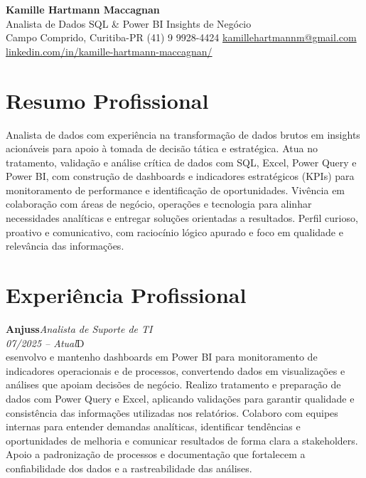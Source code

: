 \documentclass[11pt,a4paper]{article}
\newcommand{\cvrole}[4]{%
  \vspace{4pt}%
  {\bfseries\color{accentcolor}#1}\hfill{\itshape #2}\\[-2pt]%
  {\itshape #3}\hfill #4\\[6pt]%
}
\begin{document}
\begin{center}
  {\fontsize{20}{24}\selectfont\bfseries Kamille Hartmann Maccagnan}\\[8pt]
  {\large Analista de Dados \textbar{} SQL \& Power BI \textbar{} Insights de Negócio}\\[10pt]
  Campo Comprido, Curitiba-PR \enspace\textbullet\enspace (41) 9 9928-4424 \enspace\textbullet\enspace
  \href{mailto:kamillehartmannm@gmail.com}{kamillehartmannm@gmail.com}\\[3pt]
  \href{https://linkedin.com/in/kamille-hartmann-maccagnan/}{linkedin.com/in/kamille-hartmann-maccagnan/}
\end{center}

\vspace{6pt}

\section{Resumo Profissional}

Analista de dados com experiência na transformação de dados brutos em insights acionáveis para apoio à tomada de decisão tática e estratégica. Atua no tratamento, validação e análise crítica de dados com SQL, Excel, Power Query e Power BI, com construção de dashboards e indicadores estratégicos (KPIs) para monitoramento de performance e identificação de oportunidades. Vivência em colaboração com áreas de negócio, operações e tecnologia para alinhar necessidades analíticas e entregar soluções orientadas a resultados. Perfil curioso, proativo e comunicativo, com raciocínio lógico apurado e foco em qualidade e relevância das informações.

\section{Experiência Profissional}

\cvrole{Anjuss}{Analista de Suporte de TI}{07/2025 -- Atual}

Desenvolvo e mantenho dashboards em Power BI para monitoramento de indicadores operacionais e de processos, convertendo dados em visualizações e análises que apoiam decisões de negócio. Realizo tratamento e preparação de dados com Power Query e Excel, aplicando validações para garantir qualidade e consistência das informações utilizadas nos relatórios. Colaboro com equipes internas para entender demandas analíticas, identificar tendências e oportunidades de melhoria e comunicar resultados de forma clara a stakeholders. Apoio a padronização de processos e documentação que fortalecem a confiabilidade dos dados e a rastreabilidade das análises.
\end{document}
